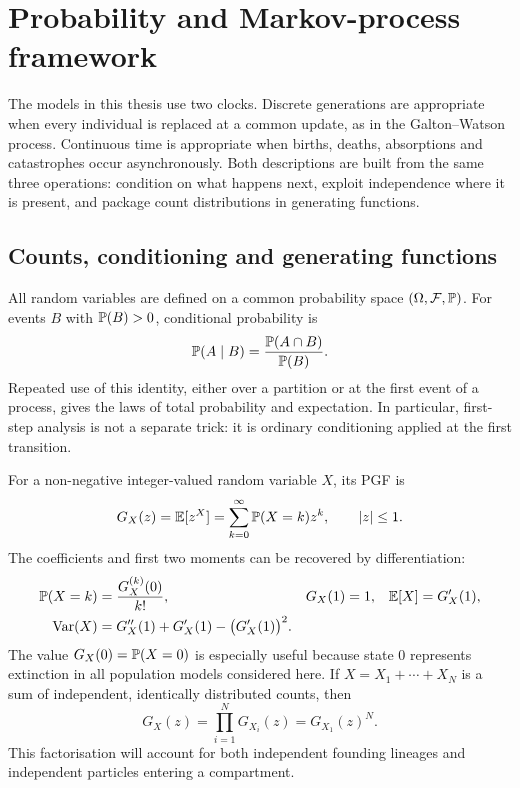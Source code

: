 \section{Probability and Markov-process framework}
\label{sec:framework}

The models in this thesis use two clocks.  Discrete generations are appropriate
when every individual is replaced at a common update, as in the Galton--Watson
process.  Continuous time is appropriate when births, deaths, absorptions and
catastrophes occur asynchronously.  Both descriptions are built from the same
three operations: condition on what happens next, exploit independence where it
is present, and package count distributions in generating functions.

\subsection{Counts, conditioning and generating functions}

All random variables are defined on a common probability space
\((\Omega,\mathcal F,\mathbb{P})\).  For events \(B\) with \(\mathbb{P}(B)>0\), conditional
probability is
\[
  \mathbb{P}(A\mid B)=\frac{\mathbb{P}(A\cap B)}{\mathbb{P}(B)}.
\]
Repeated use of this identity, either over a partition or at the first event of a
process, gives the laws of total probability and expectation.  In particular,
first-step analysis is not a separate trick: it is ordinary conditioning applied
at the first transition.

For a non-negative integer-valued random variable \(X\), its PGF is
\begin{equation}
  G_X(z)=\mathbb{E}[z^X]=\sum_{k=0}^{\infty}\mathbb{P}(X=k)z^k,
  \qquad |z|\leq1.
  \label{eq:pgf-basic}
\end{equation}
The coefficients and first two moments can be recovered by differentiation:
\begin{align}
  \mathbb{P}(X=k)&=\frac{G_X^{(k)}(0)}{k!},
  &G_X(1)&=1,
  &\mathbb{E}[X]&=G_X'(1),
  \label{eq:pgf-identities}\\
  \operatorname{Var}(X)&=G_X''(1)+G_X'(1)-\bigl(G_X'(1)\bigr)^2.
  \nonumber
\end{align}
The value \(G_X(0)=\mathbb{P}(X=0)\) is especially useful because state \(0\) represents
extinction in all population models considered here.  If
\(X=X_1+\cdots+X_N\) is a sum of independent, identically distributed counts,
then
\begin{equation}
  G_X(z)=\prod_{i=1}^{N}G_{X_i}(z)=G_{X_1}(z)^N.
  \label{eq:pgf-independence}
\end{equation}
This factorisation will account for both independent founding lineages and
independent particles entering a compartment.

